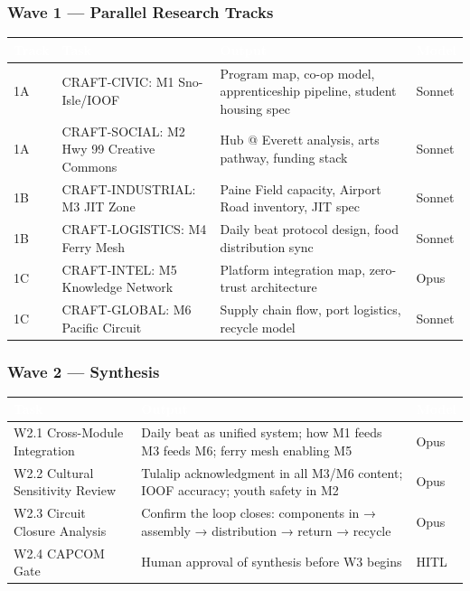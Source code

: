 \documentclass[11pt,letterpaper]{article}
\newcommand{\tableheader}[1]{\textbf{\sffamily\textcolor{white}{#1}}}
\begin{document}
\subsubsection{Wave 1 --- Parallel Research Tracks}

\begin{center}
\begin{tabularx}{\textwidth}{L{1.5cm}L{3.5cm}XC{2cm}}
\toprule
{}
\tableheader{Track} & \tableheader{Task} & \tableheader{Output} & \tableheader{Model} \\
\midrule
1A & CRAFT-CIVIC: M1 Sno-Isle/IOOF & Program map, co-op model, apprenticeship pipeline, student housing spec & Sonnet \\
1A & CRAFT-SOCIAL: M2 Hwy 99 Creative Commons & Hub @ Everett analysis, arts pathway, funding stack & Sonnet \\
1B & CRAFT-INDUSTRIAL: M3 JIT Zone & Paine Field capacity, Airport Road inventory, JIT spec & Sonnet \\
1B & CRAFT-LOGISTICS: M4 Ferry Mesh & Daily beat protocol design, food distribution sync & Sonnet \\
1C & CRAFT-INTEL: M5 Knowledge Network & Platform integration map, zero-trust architecture & Opus \\
1C & CRAFT-GLOBAL: M6 Pacific Circuit & Supply chain flow, port logistics, recycle model & Sonnet \\
\bottomrule
\end{tabularx}
\end{center}

\subsubsection{Wave 2 --- Synthesis}

\begin{center}
\begin{tabularx}{\textwidth}{L{3cm}XC{2cm}}
\toprule
{}
\tableheader{Task} & \tableheader{Output} & \tableheader{Model} \\
\midrule
W2.1 Cross-Module Integration & Daily beat as unified system; how M1 feeds M3 feeds M6; ferry mesh enabling M5 & Opus \\
W2.2 Cultural Sensitivity Review & Tulalip acknowledgment in all M3/M6 content; IOOF accuracy; youth safety in M2 & Opus \\
W2.3 Circuit Closure Analysis & Confirm the loop closes: components in → assembly → distribution → return → recycle & Opus \\
W2.4 CAPCOM Gate & Human approval of synthesis before W3 begins & HITL \\
\bottomrule
\end{tabularx}
\end{center}
\end{document}
